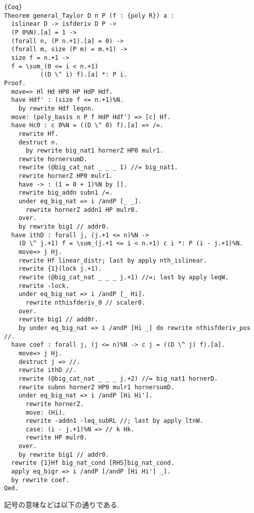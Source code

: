 \documentclass[11pt]{jsreport}
\theoremstyle{mystyle}
\newcommand{\0}{\textbf{0}}
\begin{document}
\begin{lstlisting}{Coq}
Theorem general_Taylor D n P (f : {poly R}) a :
  islinear D -> isfderiv D P ->
  (P 0%N).[a] = 1 ->
  (forall n, (P n.+1).[a] = 0) ->
  (forall m, size (P m) = m.+1) ->
  size f = n.+1 ->
  f = \sum_(0 <= i < n.+1)
          ((D \^ i) f).[a] *: P i. 
Proof.
  move=> Hl Hd HP0 HP HdP Hdf.
  have Hdf' : (size f <= n.+1)%N.
    by rewrite Hdf leqnn.
  move: (poly_basis n P f HdP Hdf') => [c] Hf.
  have Hc0 : c 0%N = ((D \^ 0) f).[a] => /=.
    rewrite Hf.
    destruct n.
      by rewrite big_nat1 hornerZ HP0 mulr1.
    rewrite hornersumD.
    rewrite (@big_cat_nat _ _ _ 1) //= big_nat1.
    rewrite hornerZ HP0 mulr1.
    have -> : (1 = 0 + 1)%N by [].
    rewrite big_addn subn1 /=.
    under eq_big_nat => i /andP [_ _].
      rewrite hornerZ addn1 HP mulr0.
    over.
    by rewrite big1 // addr0.
  have ithD : forall j, (j.+1 <= n)%N ->
    (D \^ j.+1) f = \sum_(j.+1 <= i < n.+1) c i *: P (i - j.+1)%N.
    move=> j Hj.
    rewrite Hf linear_distr; last by apply nth_islinear.
    rewrite {1}(lock j.+1).
    rewrite (@big_cat_nat _ _ _ j.+1) //=; last by apply leqW.
    rewrite -lock.
    under eq_big_nat => i /andP [_ Hi].
      rewrite nthisfderiv_0 // scaler0.
    over.
    rewrite big1 // add0r.
    by under eq_big_nat => i /andP [Hi _] do rewrite nthisfderiv_pos //.
  have coef : forall j, (j <= n)%N -> c j = ((D \^ j) f).[a].
    move=> j Hj.
    destruct j => //.
    rewrite ithD //.
    rewrite (@big_cat_nat _ _ _ j.+2) //= big_nat1 hornerD.
    rewrite subnn hornerZ HP0 mulr1 hornersumD.
    under eq_big_nat => i /andP [Hi Hi'].
      rewrite hornerZ.
      move: (Hi).
      rewrite -addn1 -leq_subRL //; last by apply ltnW.
      case: (i - j.+1)%N => // k Hk.
      rewrite HP mulr0.
    over.
    by rewrite big1 // addr0.
  rewrite {1}Hf big_nat_cond [RHS]big_nat_cond.
  apply eq_bigr => i /andP [/andP [Hi Hi'] _].
  by rewrite coef.
Qed.\end{lstlisting}
記号の意味などは以下の通りである. 
\end{document}
